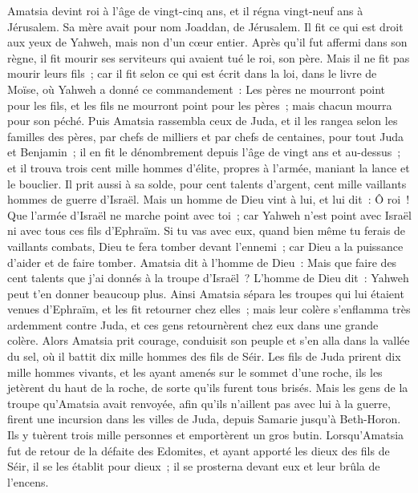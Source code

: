\begin{multicols}{2}
\VerseOne{}Amatsia devint roi à l'âge de vingt-cinq ans, et il régna vingt-neuf ans à Jérusalem. Sa mère avait pour nom Joaddan, de Jérusalem.
Il fit ce qui est droit aux yeux de Yahweh, mais non d'un cœur entier.
Après qu'il fut affermi dans son règne, il fit mourir ses serviteurs qui avaient tué le roi, son père.
Mais il ne fit pas mourir leurs fils~; car il fit selon ce qui est écrit dans la loi, dans le livre de Moïse, où Yahweh a donné ce commandement~: Les pères ne mourront point pour les fils, et les fils ne mourront point pour les pères~; mais chacun mourra pour son péché.
Puis Amatsia rassembla ceux de Juda, et il les rangea selon les familles des pères, par chefs de milliers et par chefs de centaines, pour tout Juda et Benjamin~; il en fit le dénombrement depuis l'âge de vingt ans et au-dessus~; et il trouva trois cent mille hommes d'élite, propres à l'armée, maniant la lance et le bouclier.
Il prit aussi à sa solde, pour cent talents d'argent, cent mille vaillants hommes de guerre d'Israël.
Mais un homme de Dieu vint à lui, et lui dit~: Ô roi~! Que l'armée d'Israël ne marche point avec toi~; car Yahweh n'est point avec Israël ni avec tous ces fils d'Ephraïm.
Si tu vas avec eux, quand bien même tu ferais de vaillants combats, Dieu te fera tomber devant l'ennemi~; car Dieu a la puissance d'aider et de faire tomber.
Amatsia dit à l'homme de Dieu~: Mais que faire des cent talents que j'ai donnés à la troupe d'Israël~? L'homme de Dieu dit~: Yahweh peut t'en donner beaucoup plus.
Ainsi Amatsia sépara les troupes qui lui étaient venues d'Ephraïm, et les fit retourner chez elles~; mais leur colère s'enflamma très ardemment contre Juda, et ces gens retournèrent chez eux dans une grande colère.
Alors Amatsia prit courage, conduisit son peuple et s'en alla dans la vallée du sel, où il battit dix mille hommes des fils de Séir.
Les fils de Juda prirent dix mille hommes vivants, et les ayant amenés sur le sommet d'une roche, ils les jetèrent du haut de la roche, de sorte qu'ils furent tous brisés.
Mais les gens de la troupe qu'Amatsia avait renvoyée, afin qu'ils n'aillent pas avec lui à la guerre, firent une incursion dans les villes de Juda, depuis Samarie jusqu'à Beth-Horon. Ils y tuèrent trois mille personnes et emportèrent un gros butin.
Lorsqu'Amatsia fut de retour de la défaite des Edomites, et ayant apporté les dieux des fils de Séir, il se les établit pour dieux~; il se prosterna devant eux et leur brûla de l'encens.

\end{multicols}
